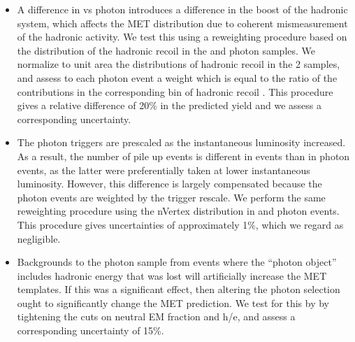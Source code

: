 

\begin{itemize}
\item A difference in \Z \pt vs photon \pt introduces a difference in the boost of the hadronic system,
  which affects the MET distribution due to coherent mismeasurement of the hadronic activity. 
  We test this using a reweighting procedure based on the distribution of the hadronic recoil \pt
  in the \Z and photon samples. We normalize to unit area the distributions of hadronic recoil \pt in 
  the 2 samples,
  and assess to each photon event a weight which is equal to the ratio of the \Z \pt contributions in 
  the corresponding
  bin of hadronic recoil \pt. This procedure gives a relative difference of 
  20\% %
  in the predicted yield and we assess a corresponding uncertainty.

\item The photon triggers are prescaled as the instantaneous luminosity increased. As a result, the 
  number of pile up events is different in \Z events than in photon events, 
  as the latter were preferentially taken at lower instantaneous luminosity. However, this difference
  is largely compensated because the photon events are weighted by the trigger rescale. We perform the
  same reweighting procedure using the nVertex distribution in \Z and photon events. This procedure 
  gives uncertainties of approximately 1\%, which we regard as negligible.

\item Backgrounds to the photon sample from events where the ``photon object'' includes 
  hadronic energy that was lost will artificially increase the MET templates. 
  If this was a significant effect, then  altering the photon selection ought to significantly 
  change the MET prediction. We test for this
  by by tightening the cuts on neutral EM fraction and h/e, 
  and assess a corresponding uncertainty of 
  15\%. %



\end{itemize}


